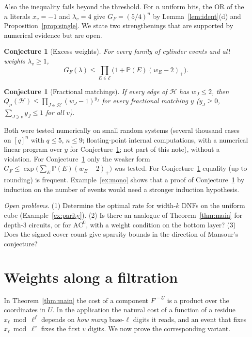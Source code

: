 \documentclass[11pt,reqno]{amsart}
\newtheorem{conjecture}[theorem]{Conjecture}
\theoremstyle{definition}
\newcommand{\PP}{\mathbb P}
\newcommand{\Ho}{\mathcal H}
\newcommand{\cE}{\mathcal E}
\begin{document}
Also the inequality fails beyond the threshold.  For $n$ uniform bits, the
OR of the $n$ literals $x_v=-1$ and $\lambda_v=4$ give $G_F=(5/4)^n$ by
Lemma~\ref{lem:ident}(d) and Proposition~\ref{prop:single}.  We state two
strengthenings that are supported by numerical evidence but are open.

\begin{conjecture}[Excess weights]\label{conj:cexp}
For every family of cylinder events and all weights $\lambda_v\ge1$,
\[
 G_F(\lambda)\le\prod_{E\in\cE}\big(1+\PP(E)(w_E-2)_+\big).
\]
\end{conjecture}

\begin{conjecture}[Fractional matchings]\label{conj:fm}
If every edge of $\Ho$ has $w_J\le2$, then $Q_\mu(\Ho)\le\prod_{J\in\Ho}(w_J-1)^{y_J}$ for
every fractional matching $y$ ($y_J\ge0$, $\sum_{J\ni v}y_J\le1$ for all $v$).
\end{conjecture}

Both were tested numerically on small random systems (several thousand
cases on $[q]^n$ with $q\le5$, $n\le9$; floating-point internal computations,
with a numerical linear program over $y$ for Conjecture~\ref{conj:fm}; not part
of this note), without a violation.  For Conjecture~\ref{conj:cexp} only the
weaker form $G_F\le\exp\big(\sum_E\PP(E)(w_E-2)_+\big)$ was tested.  For
Conjecture~\ref{conj:fm} equality (up to rounding) is frequent.  Example~\ref{ex:mono} shows that a proof of
Conjecture~\ref{conj:cexp} by induction on the number of events would
need a stronger induction hypothesis.

\emph{Open problems.}  (1) Determine the optimal rate for width-$k$ DNFs on
the uniform cube (Example~\ref{ex:parity}).  (2) Is there an analogue of
Theorem~\ref{thm:main} for depth-$3$ circuits, or for $\mathrm{AC}^0$, with a
weight condition on the bottom layer?  (3) Does the signed cover count give
sparsity bounds in the direction of Mansour's conjecture?

\section{Weights along a filtration}\label{sec:filtration}

In Theorem~\ref{thm:main} the cost of a component $F^{=U}$ is a product over
the coordinates in $U$.  In the application the natural cost of a function of
a residue $x_\ell\bmod\ell^f$ depends on \emph{how many} base-$\ell$ digits it reads,
and an event that fixes $x_\ell\bmod\ell^v$ fixes the first $v$ digits.  We now
prove the corresponding variant.
\end{document}
